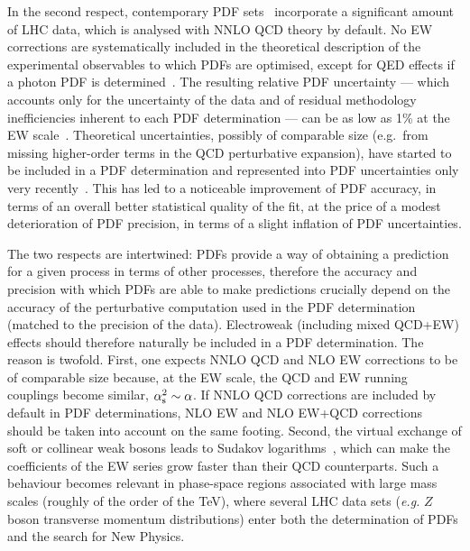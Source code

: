 In the second respect, contemporary PDF
sets~\cite{Harland-Lang:2014zoa,Ball:2017nwa,Hou:2019efy}
incorporate a significant amount of LHC data, which is analysed with NNLO QCD 
theory by default. No EW corrections are systematically included in the 
theoretical description of the experimental observables to which PDFs are 
optimised, except for QED effects if a photon PDF is 
determined~\cite{Schmidt:2015zda,Bertone:2017bme,Harland-Lang:2019pla}. 
The resulting relative PDF uncertainty --- which accounts only for the
uncertainty of the data and of residual methodology inefficiencies inherent to 
each PDF determination --- can be as low as 1\% at the EW 
scale~\cite{Ball:2017nwa}. Theoretical uncertainties, possibly of comparable 
size (e.g.\ from missing higher-order terms in the QCD perturbative
expansion), have started to be included in a PDF determination and represented 
into PDF uncertainties only very 
recently~\cite{AbdulKhalek:2019bux,AbdulKhalek:2019ihb}. This has led to a 
noticeable improvement of PDF accuracy, in terms of an overall
better statistical quality of the fit, at the price of a modest deterioration 
of PDF precision, in terms of a slight inflation of PDF uncertainties.

The two respects are intertwined: PDFs provide a way of obtaining a prediction
for a given process in terms of other processes, therefore the accuracy and 
precision with which PDFs are able to make predictions crucially depend on 
the accuracy of the perturbative computation used in the PDF determination
(matched to the precision of the data). Electroweak (including mixed QCD+EW) 
effects should therefore naturally be included in a PDF determination. The 
reason is twofold. First, one expects NNLO QCD and NLO EW corrections to be of 
comparable size because, at the EW scale, the QCD and EW running couplings 
become similar, $\alpha_\mathrm{s}^2\sim \alpha$. If NNLO QCD corrections are included
by default in PDF determinations, NLO EW and NLO EW+QCD corrections should be 
taken into account on the same footing. Second, the virtual exchange of soft or 
collinear weak bosons leads to Sudakov 
logarithms~\cite{Denner:2000jv,Denner:2001gw},
which can make the coefficients of the EW series grow faster than 
their QCD counterparts. Such a behaviour becomes relevant in
phase-space regions associated with large mass scales (roughly of the order
of the TeV), where several LHC data sets ({\it e.g.} $Z$ boson transverse 
momentum distributions) enter both the determination of PDFs and the search
for New Physics.


